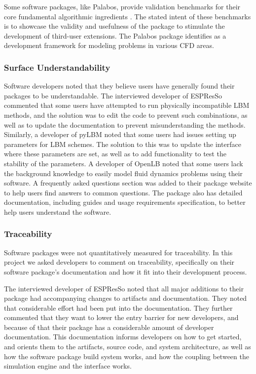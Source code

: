 \documentclass[12pt, notitlepage]{article}
\begin{document}
Some software packages, like Palabos, provide validation benchmarks for their core fundamental algorithmic ingredients \citep{latt2021palabos}. The stated intent of these benchmarks is to showcase the validity and usefulness of the package to stimulate the development of third-user extensions. The Palabos package identifies as a development framework for modeling problems in various CFD areas. 

\subsubsection{Surface Understandability}

Software developers noted that they believe users have generally found their packages to be understandable. The interviewed developer of ESPResSo commented that some users have attempted to run physically incompatible LBM methods, and the solution was to edit the code to prevent such combinations, as well as to update the documentation to prevent misunderstanding the methods. Similarly, a developer of pyLBM noted that some users had issues setting up parameters for LBM schemes. The solution to this was to update the interface where these parameters are set, as well as to add functionality to test the stability of the parameters. A developer of OpenLB noted that some users lack the background knowledge to easily model fluid dynamics problems using their software. A frequently asked questions section was added to their package website to help users find answers to common questions. The package also has detailed documentation, including guides and usage requirements specification, to better help users understand the software.

\subsubsection{Traceability}

Software packages were not quantitatively measured for traceability.
In this project we asked developers to comment on traceability, specifically on their software package's documentation and how it fit into their development process. 

The interviewed developer of ESPResSo noted that all major additions to their package had accompanying changes to artifacts and documentation. They noted that considerable effort had been put into the documentation. They further commented that they want to lower the entry barrier for new developers, and because of that their package has a considerable amount of developer documentation. This documentation informs developers on how to get started, and orients them to the artifacts, source code, and system architecture, as well as how the software package build system works, and how the coupling between the simulation engine and the interface works. 
\end{document}
